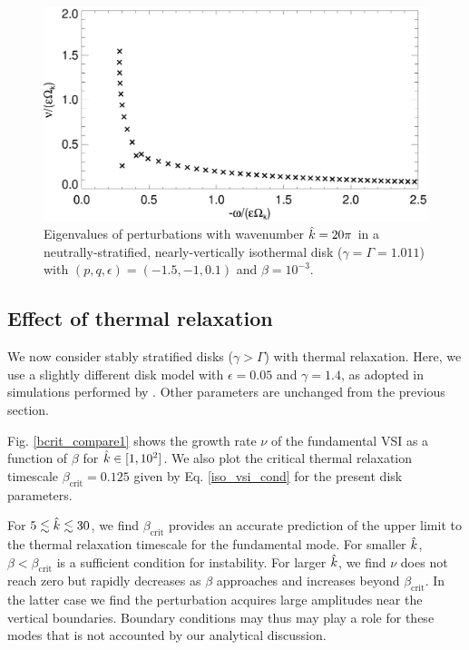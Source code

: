 \begin{figure}
  \includegraphics[width=\linewidth]{figures/eigenvalues_iso}
  \caption{Eigenvalues of perturbations with wavenumber $\hat{k}=20\pi$
    in a neutrally-stratified, nearly-vertically isothermal disk
    ($\gamma=\Gamma=1.011$) with $(p,q,\epsilon)=(-1.5,-1,0.1)$ and
    $\beta=10^{-3}$. \label{lowfreq_eigen} 
  }
\end{figure}

\subsection{Effect of thermal relaxation}
We now consider stably stratified disks ($\gamma > \Gamma$) with
thermal relaxation. Here, we use a slightly  
different disk model with $\epsilon=0.05$ and $\gamma=1.4$, as 
adopted in simulations performed by \cite{nelson13}. Other parameters 
are unchanged from the previous section.  

Fig. \ref{bcrit_compare1} shows the growth rate $\nu$ of the
fundamental VSI as a function of $\beta$ for $\hat{k}\in[1,10^2]$. We
also plot the critical thermal relaxation timescale
$\beta_\mathrm{crit}=0.125$ given by Eq. \ref{iso_vsi_cond} for the present
disk parameters.

For $5\lesssim\hat{k}\lesssim30$, we find $\beta_\mathrm{crit}$ provides an
accurate prediction of the upper limit to the thermal relaxation 
timescale for  the fundamental mode. For smaller $\hat{k}$,
$\beta<\beta_\mathrm{crit}$ is a sufficient condition for
instability. For larger $\hat{k}$, we find $\nu$ does not reach zero but
rapidly decreases as $\beta$ approaches and increases beyond
$\beta_\mathrm{crit}$. In the latter case we find the perturbation
acquires large amplitudes near the vertical boundaries. Boundary
conditions may thus may play a role for these modes that is not
accounted by our analytical discussion.  

